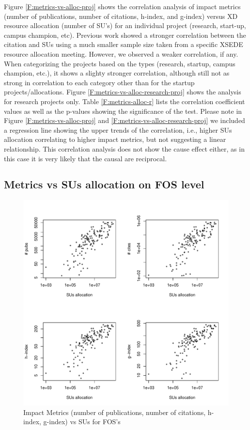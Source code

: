 \documentclass{sig-alternate}
\begin{document}
Figure \ref{F:metrics-vs-alloc-proj} shows the correlation analysis of impact metrics (number of publications, number of citations, h-index, and g-index) versus XD resource allocation (number of SU's) for an individual project (research, start-up, campus champion, etc).  Previous work showed a stronger correlation between the citation and SUs \cite{bollen2011and} using a much smaller sample size taken from a specific XSEDE resource allocation meeting. However, we observed a weaker correlation, if any. When categorizing the projects based on the types (research, startup, campus champion, etc.), it shows a slighty stronger correlation,  although still not as strong in correlation to each category other than for the startup projects/allocations. Figure \ref{F:metrics-vs-alloc-research-proj} shows the analysis for research projects only. Table \ref{F:metrics-alloc-r} lists the correlation coefficient values as well as the p-values showing the significance of the test. Please note in Figure \ref{F:metrics-vs-alloc-proj} and \ref{F:metrics-vs-alloc-research-proj} we included a regression line showing the upper trends of the correlation, i.e., higher SUs allocation correlating to higher impact metrics, but not suggesting a linear relationship. This correlation analysis does not show the cause effect either, as in this case it is very likely that the causal are reciprocal. 
 
\subsection{Metrics vs SUs allocation on FOS level} 
 
\begin{figure}[!htb] 
  \centering 
    \includegraphics[width=1.0\columnwidth]{images/03_metrics_vs_alloc_fos.pdf} 
  \caption{Impact Metrics (number of publications, number of citations, h-index, g-index) vs SUs for FOS's}\label{F:metrics-vs-alloc-fos} 
\end{figure} 
\end{document}
